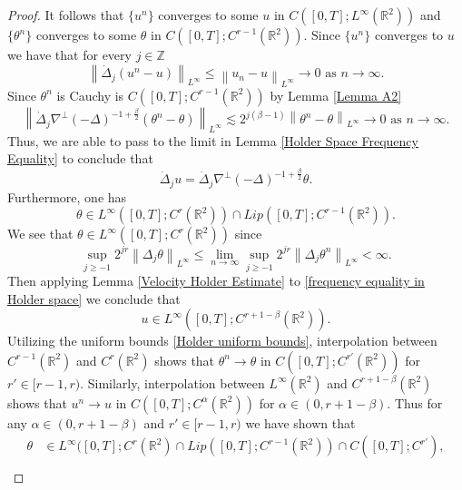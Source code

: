 \documentclass[12pt,xcolor=svgnames]{amsart}
\newcommand{\R}{\mathbb{R}}
\newcommand{\abs}[1]{\mid\!#1\!\mid}
\newcommand{\norm}[2]{\left\lVert#1\right\rVert_{#2}}
\begin{document}
\begin{proof}
It follows that $\{u^n\}$ converges to some $u$ in $C([0,T];L^{\infty}(\R^2))$ and $\{\theta^n\}$ converges to some $\theta$ in $C([0,T];C^{r-1}(\R^2))$. Since $\{u^n\}$ converges to $u$ we have that for every $j \in \mathbb{Z}$ 
$$
\norm{\dot{\Delta}_j(u^n-u)}{L^{\infty}} \leq \norm{u_n-u}{L^{\infty}}  \to 0 \text{ as } n \to \infty.
$$
Since $\theta^n$ is Cauchy is $C([0,T];C^{r-1}(\R^2))$ by Lemma \ref{Lemma A2}
$$
\norm{\dot{\Delta}_j\nabla^{\perp}(-\Delta)^{-1+\frac{\beta}{2}}(\theta^n-\theta)}{L^{\infty}}\lesssim 2^{j(\beta-1)}\norm{\theta^n-\theta}{L^{\infty}} \to 0 \text{ as } n \to \infty.
$$
Thus, we are able to pass to the limit in Lemma \ref{Holder Space Frequency Equality} to conclude that 
\begin{equation}
\label{frequency equality in Holder space}
\dot{\Delta}_j u = \dot{\Delta}_j \nabla^{\perp} (-\Delta)^{-1+\frac{\beta}{2}}\theta. 
\end{equation}
Furthermore, one has
$$
\theta \in L^{\infty}([0,T]; C^r(\R^2)) \cap Lip([0,T]; C^{r-1}(\R^2)).
$$
We see that $\theta \in L^{\infty}([0,T]; C^r(\R^2))$ since 
$$
\sup_{j \geq -1} 2^{jr}\norm{\Delta_j \theta}{L^{\infty}} \leq \lim_{n \to \infty} \sup_{j \geq -1} 2^{jr}\norm{\Delta_j \theta^n}{L^{\infty}}<\infty.
$$
Then applying Lemma \ref{Velocity Holder Estimate} to \eqref{frequency equality in Holder space} we conclude that
$$
u \in L^{\infty}([0,T]; C^{r+1-\beta}(\R^2)).
$$
Utilizing the uniform bounds \eqref{Holder uniform bounds}, interpolation between $C^{r-1}(\R^2)$ and $C^r(\R^2)$ shows that $\theta^n \to \theta$ in $C([0,T];C^{r'}(\R^2))$ for $r' \in [r-1,r)$. Similarly, interpolation between $L^{\infty}(\R^2)$ and $C^{r+1-\beta}(\R^2)$ shows that $u^n \to u$ in $C([0,T];C^{\alpha}(\R^2))$ for $\alpha \in (0,r+1-\beta)$. Thus for any $\alpha \in (0,r+1-\beta)$ and $ r' \in [r-1,r)$ we have shown that 
\begin{align*}
    \theta &\in L^{\infty}([0,T]; C^r(\R^2) \cap Lip([0,T]; C^{r-1}(\R^2)) \cap C([0,T];C^{r'}), \\

\end{align*}
\end{proof}
\end{document}
